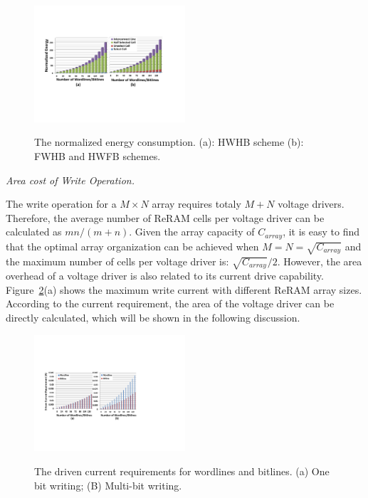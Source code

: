 \begin{figure}%
\centering
  \includegraphics[width=0.5\textwidth]{./figures/energy_f.pdf}\\
  \caption{The normalized energy consumption. (a): HWHB scheme (b): FWHB and HWFB schemes.}\label{fig:energy}
    \vspace{-10pt}
\end{figure}

\vspace{6pt} \emph{Area cost of Write Operation.} \vspace{6pt}

The write operation for a $M \times N$ array requires totaly $M+N$ voltage
drivers. Therefore, the average number of ReRAM cells per voltage driver
can be calculated as $mn/(m+n)$. Given the array capacity of $C_{array}$,
it is easy to find that the optimal array organization can be achieved
when $M=N=\sqrt{C_{array}}$ and the maximum number of cells per voltage
driver is: $\sqrt{C_{array}}/2$. However, the area overhead of a voltage
driver is also related to its current drive capability.
Figure~\ref{fig:drive_i}(a) shows the maximum write current with different
ReRAM array sizes. According to the current requirement, the area of the
voltage driver can be directly calculated, which will be shown in the
following discussion.

\begin{figure}%
\centering
  \includegraphics[width=0.5\textwidth]{./figures/drive_i_f.pdf}\\
  \caption{The driven current requirements for wordlines and bitlines. (a) One bit writing; (B) Multi-bit writing.}\label{fig:drive_i}
\end{figure}


